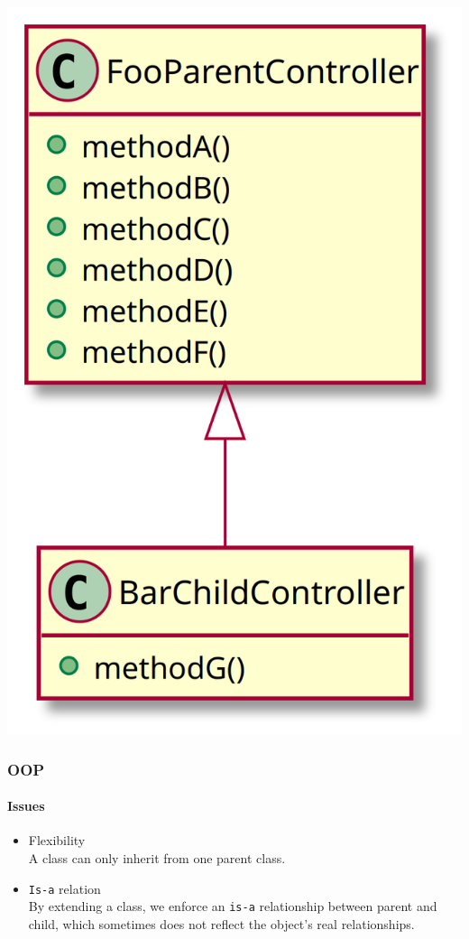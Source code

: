 \begin{frame}[fragile,c]
    \begin{center}
        \includegraphics[height=\textheight]{src/session--composition-and-inheritance/resources/break-encapsulation.png}
    \end{center}
\end{frame}

\begin{frame}
    \frametitle{OOP}
    \framesubtitle{Issues}

    \begin{itemize}
        \item Flexibility\pause
              \\\textcolor{ecgrey!50}{A class can only inherit from one parent class.}
        \pause
        \item \texttt{Is-a} relation\pause
              \textcolor{ecgrey!50}{
              \\By extending a class, we enforce an \texttt{is-a} relationship between
              parent and child, which sometimes does not reflect the object’s real relationships.}
    \end{itemize}
\end{frame}

